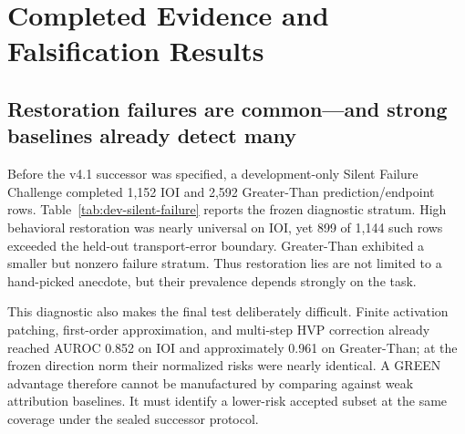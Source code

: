 \documentclass{article}
\begin{document}
\section{Completed Evidence and Falsification Results}
\label{sec:results}

\subsection{Restoration failures are common---and strong baselines already detect many}
Before the v4.1 successor was specified, a development-only Silent Failure Challenge completed 1,152 IOI and 2,592 Greater-Than prediction/endpoint rows. Table~\ref{tab:dev-silent-failure} reports the frozen diagnostic stratum. High behavioral restoration was nearly universal on IOI, yet 899 of 1,144 such rows exceeded the held-out transport-error boundary. Greater-Than exhibited a smaller but nonzero failure stratum. Thus restoration lies are not limited to a hand-picked anecdote, but their prevalence depends strongly on the task.

\begin{table}[t]
\caption{Development-only evidence that behavioral restoration and held-out transport can disagree. These outcomes were opened before the v4.1 successor and are reported as diagnostics only; they were not eligible for selecting its rule. ``Baseline AUROC'' is the strongest frozen public-panel patching/first-order/MS-HVP diagnostic in the same provisional stratum.}
\label{tab:dev-silent-failure}
\centering\small
{}%
\end{table}

This diagnostic also makes the final test deliberately difficult. Finite activation patching, first-order approximation, and multi-step HVP correction already reached AUROC 0.852 on IOI and approximately 0.961 on Greater-Than; at the frozen direction norm their normalized risks were nearly identical. A GREEN advantage therefore cannot be manufactured by comparing against weak attribution baselines. It must identify a lower-risk accepted subset at the same coverage under the sealed successor protocol.
\end{document}
